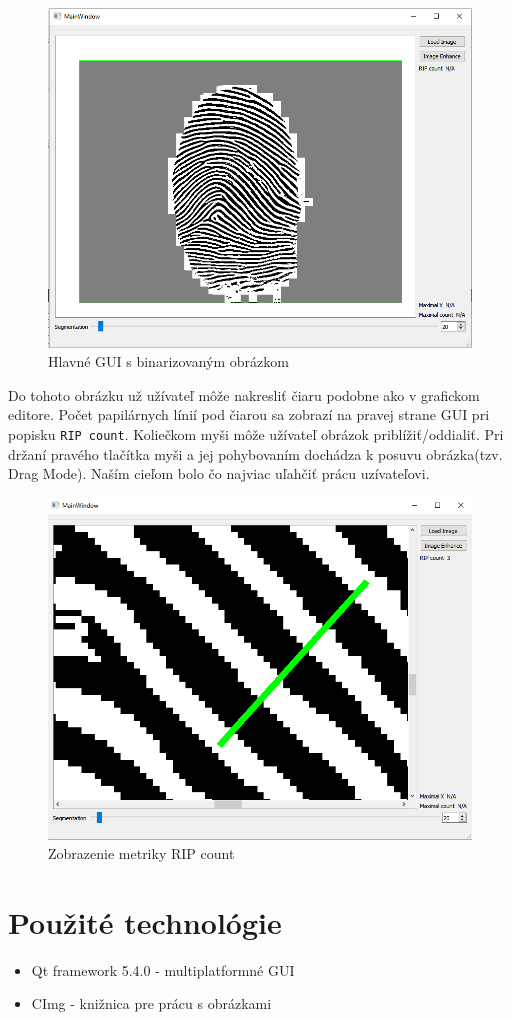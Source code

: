 \documentclass[11pt,a4paper]{article}
\begin{document}
\begin{figure}[h!]
	\centering
	\includegraphics[width=.7\linewidth]{images/Screenshot_15}
	\caption{Hlavné GUI s binarizovaným obrázkom}
	\label{fig:11}
\end{figure}

Do tohoto obrázku už užívateľ môže nakresliť čiaru podobne ako v grafickom editore. Počet papilárnych línií pod čiarou sa zobrazí na pravej strane GUI pri popisku \texttt{RIP count}. Koliečkom myši môže užívateľ obrázok priblížiť/oddialiť. Pri držaní pravého tlačítka myši a jej pohybovaním dochádza k posuvu obrázka(tzv. Drag Mode). Naším cieľom bolo čo najviac uľahčiť prácu uzívateľovi.

\begin{figure}[h!]
	\centering
	\includegraphics[width=.7\linewidth]{images/Screenshot_16}
	\caption{Zobrazenie metriky RIP count}
	\label{fig:11}
\end{figure}

\section*{Použité technológie}
\begin{itemize}
	\item Qt framework 5.4.0 - multiplatformné GUI
	\item CImg - knižnica pre prácu s obrázkami
\end{itemize}
\end{document}

